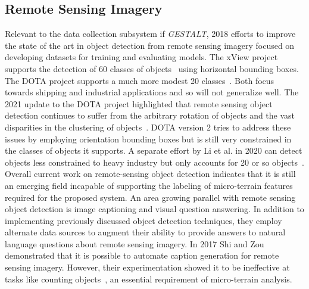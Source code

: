 \subsection{Remote Sensing Imagery}
Relevant to the data collection subsystem if \textit{GESTALT}, 2018 efforts to improve the state of the art in object detection from remote sensing imagery focused on developing datasets for training and evaluating models. 
The xView project supports the detection of 60 classes of objects~\cite{Lam2018} using horizontal bounding boxes. The DOTA project supports a much more modest 20 classes~\cite{Xia2018}. 
Both focus towards shipping and industrial applications and so will not generalize well. The 2021 update to the DOTA project highlighted that remote sensing object detection continues to suffer from the arbitrary rotation of objects and the vast disparities in the clustering of objects~\cite{Ding2021}. 
DOTA version 2 tries to address these issues by employing orientation bounding boxes but is still very constrained in the classes of objects it supports. 
A separate effort by Li et al. in 2020 can detect objects less constrained to heavy industry but only accounts for 20 or so objects~\cite{Li2020}. 
Overall current work on remote-sensing object detection indicates that it is still an emerging field incapable of supporting the labeling of micro-terrain features required for the proposed system. 
An area growing parallel with remote sensing object detection is image captioning and visual question answering. 
In addition to implementing previously discussed object detection techniques, they employ alternate data sources to augment their ability to provide answers to natural language questions about remote sensing imagery. 
In 2017 Shi and Zou demonstrated that it is possible to automate caption generation for remote sensing imagery. However, their experimentation showed it to be ineffective at tasks like counting objects~\cite{Shi2017}, an essential requirement of micro-terrain analysis.

